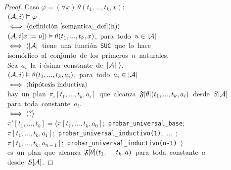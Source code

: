 \begin{proof}
\noindent Caso $\varphi = (\forall x)\ \theta(t_1,...,t_k,x):$\\
\mbox{\hspace{10mm} $(\mathcal{A}, i) \vDash \varphi$}\\
\mbox{\hspace{5mm} $\iff \langle \text{definición \ref{semantica_def}(h)} \rangle$}\\
\mbox{\hspace{10mm} $(\mathcal{A}, i[x:=u]) \vDash \theta(t_1,...,t_k,x)$, para todo $u\in|\mathcal{A}|$}\\
\mbox{\hspace{5mm} $\iff \langle |\mathcal{A}|$ tiene una función \texttt{SUC} que lo
hace}\\
\mbox{\hspace{15mm} isomórfico al conjunto de los primeros $n$ naturales.}\\
\mbox{\hspace{15mm} Sea $a_i$ la i-ésima constante de $|\mathcal{A}| \ \rangle$.}\\
\mbox{\hspace{10mm} $(\mathcal{A}, i) \vDash \theta(t_1,...,t_k,a_i)$, para todo $a_i
\in |\mathcal{A}|$}\\
\mbox{\hspace{5mm} $\iff \langle \text{hipótesis inductiva} \rangle$}\\
\mbox{\hspace{10mm} hay un plan $\pi_i[t_1,...,t_k,a_i]$ que alcanza
$\mathfrak{F}[\theta](t_1,...,t_k,a_i)$ desde $S[\mathcal{A}]$}\\
\mbox{\hspace{10mm} para toda constante $a_i$.}\\
\mbox{\hspace{5mm} $\iff \langle \text{?} \rangle$}\\
\mbox{\hspace{10mm} $\pi'[t_1,...,t_k] =
\langle \pi[t_1,...,t_k,a_0]$;\ \texttt{probar\_universal\_base};}\\
\mbox{\hspace{10mm}
$\pi[t_1,...,t_k,a_1]$;\ \texttt{probar\_universal\_inductivo(1)};\ ...\ ;}\\
\mbox{\hspace{10mm} $\pi[t_1,...,t_k,a_{n-1}]$;\
\texttt{probar\_universal\_inductivo(n-1)} $\rangle$}\\
\mbox{\hspace{10mm} es un plan que alcanza $\mathfrak{F}[\theta](t_1,...,t_k,a)$ para
toda constante $a$}\\
\mbox{\hspace{10mm} desde $S[\mathcal{A}]$.}
\end{proof}


